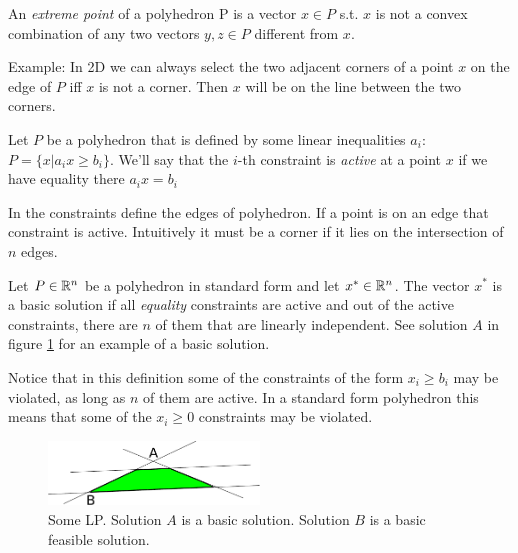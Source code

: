 \begin{Def}\label{Def:ExtremePoint} An \emph{extreme point} of a polyhedron P is a vector $x\in P$ s.t. $x$ is not a convex combination of any two vectors $y,z\in P$ different from $x$. 
\end{Def}
Example: In 2D we can always select the two adjacent corners of a point $x$ on the edge of $P$ iff $x$ is not a corner. Then $x$ will be on the line between the two corners. 

\begin{Def}\label{Def:ActiveConstraint} Let $P$ be a polyhedron that is defined by some linear inequalities $a_i$: $P=\{x|a_ix\geq b_i\}$. We'll say that the $i$-th constraint is \emph{active} at a point $x$ if we have equality there $a_ix = b_i$
\end{Def}

In the constraints define the edges of polyhedron. If a point is on an edge that constraint is active. Intuitively it must be a corner if it lies on the intersection of $n$ edges.

\begin{Def}\label{Def:BasicSolution}Let $P\in \mathbb{R}^n$ be a polyhedron in standard form and let $x^{*}\in \mathbb{R}^n$. The vector $x^{*}$ is a basic solution if all \emph{equality} constraints are active and out of the active constraints, there are $n$ of them that are linearly independent. See solution $A$ in figure \ref{Fig:bsfVSbs} for an example of a basic solution.
\end{Def}
Notice that in this definition some of the constraints of the form $x_i \geq b_i$ may be violated, as long as $n$ of them are active. In a standard form polyhedron this means that some of the $x_i \geq 0$ constraints may be violated. 

\begin{figure}[hbt]
\begin{center}
\includegraphics[width=0.5\textwidth]{./images/basicVsBasicFeasible.pdf}
\end{center}
\caption{Some LP. Solution $A$ is a basic solution. Solution $B$ is a basic feasible solution.}
\label{Fig:bsfVSbs}
\end{figure}


